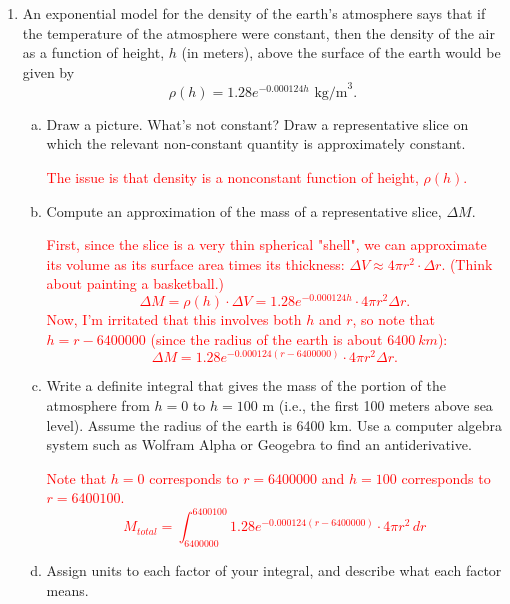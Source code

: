 \documentclass[12pt]{article}
\newcommand{\red}[1]{ \textcolor{red}{#1 } }
\begin{document}
\begin{enumerate}
\begin{enumerate}[(a)]
\item Which will require more energy, to move the magnet from 5 cm away to 3 cm away, or from 3 cm away to 2 cm away?

\red{\[\int_{0.02}^{0.03} \frac{k}{x^2}\,dx = \frac{-k}{x}\bigg|_{0.02}^{0.03} = k\cdot\SI{16.67}{J},\] so it takes more energy to move from 3cm away to 2cm away.}
\end{enumerate}
\item An exponential model for the density of the earth's atmosphere says that if the temperature of the atmosphere were constant, then the density of the air as a function of height, \(h\) (in meters), above the surface of the earth would be given by
\[ \rho(h) = 1.28 e^{-0.000124 h} \text{ kg/m}^3.\]
\begin{enumerate}[(a)]
\item Draw a picture. What's not constant? Draw a representative slice on which the relevant non-constant quantity is approximately constant. 

\red{The issue is that density is a nonconstant function of height, $\rho(h)$.}

\item Compute an approximation of the mass of a representative slice, $\Delta M$.

\red{
First, since the slice is a very thin spherical "shell", we can approximate its volume as its surface area times its thickness: $\Delta V \approx 4\pi r^2\cdot \Delta r$. (Think about painting a basketball.)
\[\Delta M = \rho(h) \cdot \Delta V = 1.28 e^{-0.000124 h} \cdot 4\pi r^2 \Delta r.\]
Now, I'm irritated that this involves both $h$ and $r$, so note that $h = r - 6400000$ (since the radius of the earth is about $\SI{6400}{km}$):
\[\Delta M = 1.28 e^{-0.000124 (r - 6400000)} \cdot 4\pi r^2\Delta r.\]
}
\item Write a definite integral that gives the mass of the portion of the atmosphere from \(h = 0\) to  \(h = 100\) m (i.e., the first 100 meters above sea level). Assume the radius of the earth is 6400 km. Use a computer algebra system such as Wolfram Alpha or Geogebra to find an antiderivative.

\red{
Note that $h = 0$ corresponds to $r = 6400000$ and $h = 100$ corresponds to $r = 6400100$.
\[M_{total} = \int_{6400000}^{6400100} 1.28 e^{-0.000124 (r - 6400000)} \cdot 4\pi r^2\,dr\]
}

\item Assign units to each factor of your integral, and describe what each factor means.


\end{enumerate}
\end{enumerate}
\end{document}
